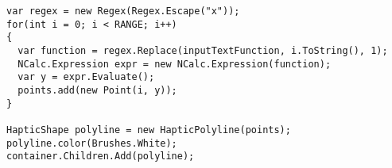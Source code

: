 \lstset{style=sharpc1}
\begin{lstlisting}[caption={Function Visualiser pseudocode},label={lst:functVisPseudo}]
var regex = new Regex(Regex.Escape("x"));
for(int i = 0; i < RANGE; i++)
{
  var function = regex.Replace(inputTextFunction, i.ToString(), 1);
  NCalc.Expression expr = new NCalc.Expression(function);
  var y = expr.Evaluate();
  points.add(new Point(i, y));
}

HapticShape polyline = new HapticPolyline(points);
polyline.color(Brushes.White);
container.Children.Add(polyline);

\end{lstlisting}